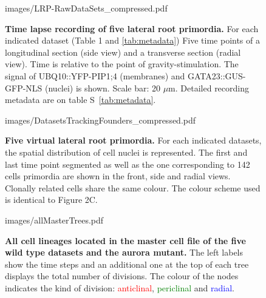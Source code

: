 \documentclass[11pt,a4paper, final]{article}
\begin{document}
%
\clearpage
%
\begin{figure}[htbp]
	\begin{center}
	\begin{overpic}[width=1.\linewidth]{images/LRP-RawDataSets_compressed.pdf}
	\end{overpic}
\caption[Time lapse recording of five lateral root primordia.]
{{\bf Time lapse recording of five lateral root primordia.} For each indicated dataset (Table 1 and \ref{tab:metadata}) Five time points of a longitudinal section (side view) and a transverse section (radial view). Time is relative to the point of gravity-stimulation. The signal of UBQ10::YFP-PIP1;4 (membranes) and GATA23::GUS-GFP-NLS (nuclei) is shown. Scale bar: 20 $\mu$m. Detailed recording metadata are on table S~\ref{tab:metadata}.}
	\label{fig:alldatasets}
	\end{center}
\end{figure}
%
\clearpage
\begin{figure}[htbp]
	\begin{center}
	\begin{overpic}[width=1.\linewidth]{images/DatasetsTrackingFounders_compressed.pdf}
	\end{overpic}
\caption[Five virtual lateral root primordia.]
{{\bf Five virtual lateral root primordia.} For each indicated datasets, the spatial distribution of cell nuclei is represented. The first and last time point segmented as well as the one corresponding to 142 cells primordia are shown in the front, side and radial views. Clonally related cells share the same colour. The colour scheme used is identical to Figure 2C. }
	\label{fig:trackingfounders}
	\end{center}
\end{figure}
%
\clearpage
%
\begin{figure}[htbp]
	\begin{center}
		\begin{overpic}[width=0.95\linewidth]{images/allMasterTrees.pdf}
		\end{overpic}
\caption[All cell lineages located in the master cell file of the five wild type datasets and the aurora mutant.]
{
{\bf All cell lineages located in the master cell file of the five wild type datasets and the aurora mutant.} The left labels show the time steps and an additional one at the top of each tree displays the total number of divisions. The colour of the nodes indicates the kind of division: \textcolor{red}{anticlinal}, \textcolor{green}{periclinal} and \textcolor{blue}{radial}.
}
	\label{fig:allMasterTrees}
	\end{center}
\end{figure}
\end{document}
